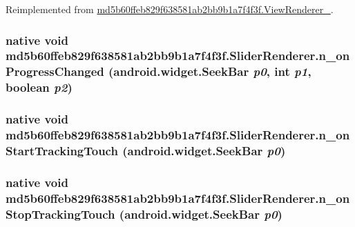 Reimplemented from \hyperlink{classmd5b60ffeb829f638581ab2bb9b1a7f4f3f_1_1_view_renderer__2_40c528ea52e22dd29fa541de43c0a010}{md5b60ffeb829f638581ab2bb9b1a7f4f3f.ViewRenderer\_}.\hypertarget{classmd5b60ffeb829f638581ab2bb9b1a7f4f3f_1_1_slider_renderer_48491426a16d1d4462c9101a1aab8b4e}{
\subsubsection[{n\_\-onProgressChanged}]{\setlength{\rightskip}{0pt plus 5cm}native void md5b60ffeb829f638581ab2bb9b1a7f4f3f.SliderRenderer.n\_\-onProgressChanged (android.widget.SeekBar {\em p0}, \/  int {\em p1}, \/  boolean {\em p2})}}
\label{classmd5b60ffeb829f638581ab2bb9b1a7f4f3f_1_1_slider_renderer_48491426a16d1d4462c9101a1aab8b4e}


\hypertarget{classmd5b60ffeb829f638581ab2bb9b1a7f4f3f_1_1_slider_renderer_2ee7717dd05e5df6b6ecce7b38531ede}{
\subsubsection[{n\_\-onStartTrackingTouch}]{\setlength{\rightskip}{0pt plus 5cm}native void md5b60ffeb829f638581ab2bb9b1a7f4f3f.SliderRenderer.n\_\-onStartTrackingTouch (android.widget.SeekBar {\em p0})}}
\label{classmd5b60ffeb829f638581ab2bb9b1a7f4f3f_1_1_slider_renderer_2ee7717dd05e5df6b6ecce7b38531ede}


\hypertarget{classmd5b60ffeb829f638581ab2bb9b1a7f4f3f_1_1_slider_renderer_432e06931257e3032239761823cb6329}{
\subsubsection[{n\_\-onStopTrackingTouch}]{\setlength{\rightskip}{0pt plus 5cm}native void md5b60ffeb829f638581ab2bb9b1a7f4f3f.SliderRenderer.n\_\-onStopTrackingTouch (android.widget.SeekBar {\em p0})}}
\label{classmd5b60ffeb829f638581ab2bb9b1a7f4f3f_1_1_slider_renderer_432e06931257e3032239761823cb6329}


